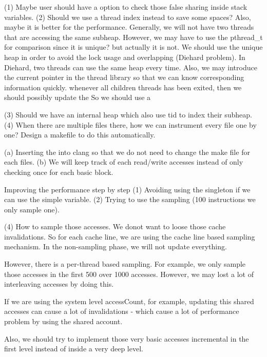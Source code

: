 (1) Maybe user should have a option to check those false sharing inside stack variables.
(2) Should we use a thread index instead to save some spaces? Also, maybe it is better for the performance. 
    Generally, we will not have two threads that are accessing the same subheap. However, we may have to use
    the pthread\_t for comparison since it is unique? but actually it is not.
    We should use the unique heap in order to avoid the lock usage and overlapping (Diehard problem). In Diehard,
    two threads can use the same heap every time. 
    Also, we may introduce the current pointer in the thread library so that we can know corresponding information quickly. 
    whenever all children threads has been exited, then we should possibly update the 
    So we should use a

(3) Should we have an internal heap which also use tid to index their subheap.
(4) When there are multiple files there, how we can instrument every file one by one? Design a makefile to do this automatically. 

(a) Inserting the into clang so that we do not need to change the make file for each files.
(b) We will keep track of each read/write accesses instead of only checking once for each basic block.


Improving the performance step by step
(1) Avoiding using the singleton if we can use the simple variable.
(2) Trying to use the sampling (100 instructions we only sample one).

(4) How to sample those accesses. We donot want to loose those cache invalidations. 
So for each cache line, we are using the cache line based sampling mechanism. 
In the non-sampling phase, we will not update everything. 

However, there is a per-thread based sampling. For example, we only sample those accesses in the 
first 500 over 1000 accesses. However, we may lost a lot of interleaving accesses by doing this. 

If we are using the system level accessCount, for example, updating this shared accesses can cause a lot of
invalidations - which cause a lot of performance problem by using the shared account.

Also, we should try to implement those very basic accesses incremental in the first level instead of inside a very deep level.


